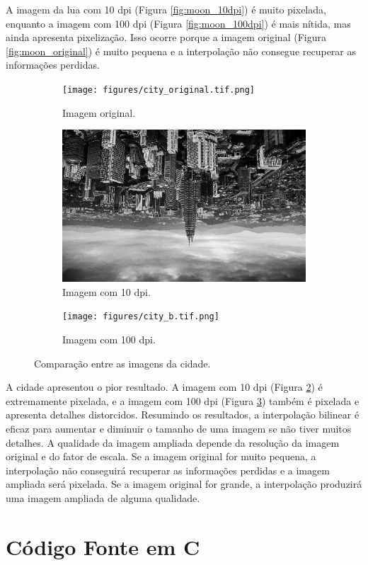 \documentclass{article}
\begin{document}
A imagem da lua com 10 dpi (Figura \ref{fig:moon_10dpi}) é muito pixelada, enquanto a imagem com 100 dpi (Figura \ref{fig:moon_100dpi}) é mais nítida, mas ainda apresenta pixelização. Isso ocorre porque a imagem original (Figura \ref{fig:moon_original}) é muito pequena e a interpolação não consegue recuperar as informações perdidas.

\begin{figure}[H]
    \centering
        \begin{subfigure}[b]{0.3\textwidth}
            \texttt{[image: figures/city\_original.tif.png]}
            \caption{Imagem original.}
            \label{fig:city_original}
        \end{subfigure}
        \hfill
        \begin{subfigure}[b]{0.3\textwidth}
            \includegraphics[width=\textwidth, angle=180]{figures/city_a.tif.png}
            \caption{Imagem com 10 dpi.}
            \label{fig:city_10dpi}
        \end{subfigure}
        \hfill
        \begin{subfigure}[b]{0.3\textwidth}
            \texttt{[image: figures/city\_b.tif.png]}
            \caption{Imagem com 100 dpi.}
            \label{fig:city_100dpi}
        \end{subfigure}
        \caption{Comparação entre as imagens da cidade.}
        \label{fig:city_comparison}
\end{figure}
A cidade apresentou o pior resultado. A imagem com 10 dpi (Figura \ref{fig:city_10dpi}) é extremamente pixelada, e a imagem com 100 dpi (Figura \ref{fig:city_100dpi}) também é pixelada e apresenta detalhes distorcidos.
 Resumindo os resultados, a interpolação bilinear é eficaz para aumentar e diminuir o tamanho de uma imagem se não tiver muitos detalhes. A qualidade da imagem ampliada depende da resolução da imagem original e do fator de escala. Se a imagem original for muito pequena, a interpolação não conseguirá recuperar as informações perdidas e a imagem ampliada será pixelada. Se a imagem original for grande, a interpolação produzirá uma imagem ampliada de alguma qualidade.
\section{Código Fonte em C}

\end{document}
